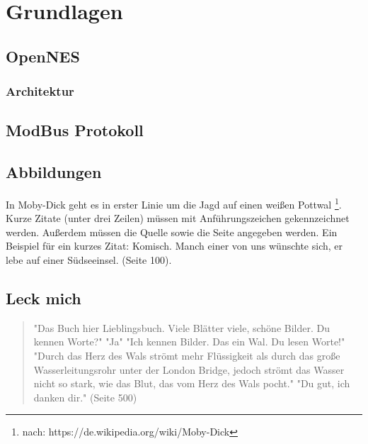 \chapter{Grundlagen}

\section{OpenNES}

\subsection{Architektur}

\subsection{}

\section{ModBus Protokoll}

\section{Abbildungen}

In Moby-Dick geht es in erster Linie um die Jagd auf einen weißen Pottwal \footnote{nach: https://de.wikipedia.org/wiki/Moby-Dick}. Kurze Zitate (unter drei Zeilen) müssen mit Anführungszeichen gekennzeichnet werden. Außerdem müssen die Quelle sowie die Seite angegeben werden. Ein Beispiel für ein kurzes Zitat: \glqq Komisch. Manch einer von uns wünschte sich, er lebe auf einer Südseeinsel.\grqq \cite{MELVILLE:MOBYDICK1997} (Seite 100).
\section{Leck mich}
  \begin{quote}
"Das Buch hier Lieblingsbuch. Viele Blätter viele, schöne Bilder. Du kennen Worte?"\newline
"Ja"\newline
"Ich kennen Bilder. Das ein Wal. Du lesen Worte!"\newline
"Durch das Herz des Wals strömt mehr Flüssigkeit als durch das große Wasserleitungsrohr unter der London Bridge, jedoch strömt das Wasser nicht so stark, wie das Blut, das vom Herz des Wals pocht."\newline
"Du gut, ich danken dir."  \upshape \cite{MELVILLE:MOBYDICK1997} (Seite 500)
  \end{quote}

